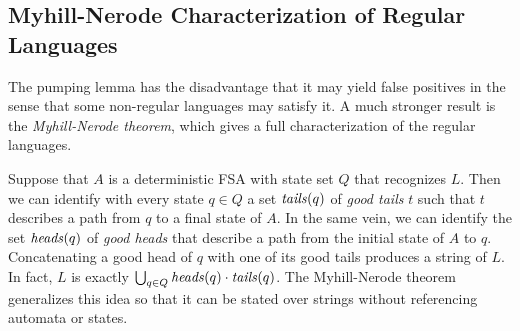 \subsection{Myhill-Nerode Characterization of Regular Languages}

The pumping lemma has the disadvantage that it may yield false positives in the sense that some non-regular languages may satisfy it.
A much stronger result is the \emph{Myhill-Nerode theorem}, which gives a full characterization of the regular languages.

Suppose that $A$ is a deterministic FSA with state set $Q$ that recognizes $L$.
Then we can identify with every state $q \in Q$ a set $\mathit{tails}(q)$ of \emph{good tails} $t$ such that $t$ describes a path from $q$ to a final state of $A$.
In the same vein, we can identify the set $\mathit{heads}(q)$ of \emph{good heads} that describe a path from the initial state of $A$ to $q$.
Concatenating a good head of $q$ with one of its good tails produces a string of $L$.
In fact, $L$ is exactly $\bigcup_{q \in Q} \mathit{heads}(q) \cdot \mathit{tails}(q)$.
The Myhill-Nerode theorem generalizes this idea so that it can be stated over strings without referencing automata or states.

